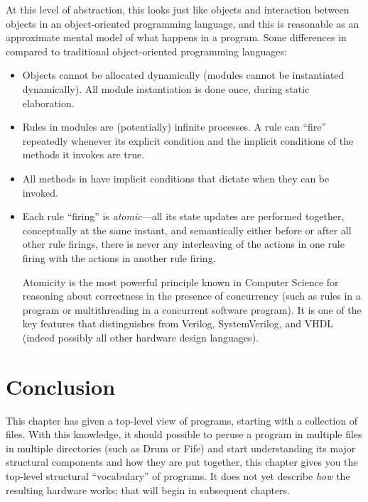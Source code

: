 At this level of abstraction, this looks just like objects and
interaction between objects in an object-oriented programming
language, and this is reasonable as an approximate mental model of
what happens in a {\BSV} program.  Some differences in {\BSV} compared to
traditional object-oriented programming languages:

\begin{itemize}

 \item Objects cannot be allocated dynamically (modules cannot be
       instantiated dynamically).  All module instantiation is done
       once, during static elaboration.

 \item Rules in {\BSV} modules are (potentially) infinite processes.  A
       rule can ``fire'' repeatedly whenever its explicit condition
       and the implicit conditions of the methods it invokes are true.

 \item All methods in {\BSV} have implicit conditions that dictate when
       they can be invoked.

 \item Each rule ``firing'' is \emph{atomic}---all its state updates
       are performed together, conceptually at the same instant, and
       semantically either before or after all other rule firings,
       {\ie} there is never any interleaving of the actions in one
       rule firing with the actions in another rule firing.

       Atomicity is the most powerful principle known in Computer
       Science for reasoning about correctness in the presence of
       concurrency (such as rules in a {\BSV} program or multithreading
       in a concurrent software program).  It is one of the key
       features that distinguishes {\BSV} from Verilog, SystemVerilog,
       and VHDL (indeed possibly all other hardware design languages).

\end{itemize}


\section{Conclusion}

This chapter has given a top-level view of {\BSV} programs, starting with
a collection of files.  With this knowledge, it should possible to
peruse a {\BSV} program in multiple files in multiple directories (such
as Drum or Fife) and start understanding its major structural
components and how they are put together, {\ie} this chapter gives you
the top-level structural ``vocabulary'' of {\BSV} programs.  It does not
yet describe \emph{how} the resulting hardware works; that will begin
in subsequent chapters.

